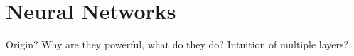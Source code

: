 \section{Neural Networks}
Origin? Why are they powerful, what do they do? Intuition of multiple layers?